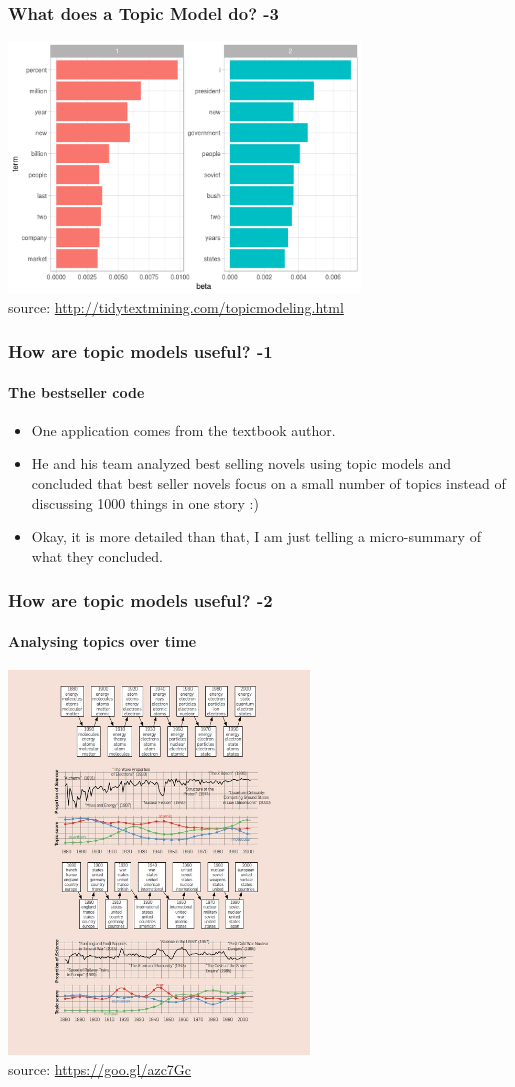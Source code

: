 \documentclass{beamer}
\begin{document}
\begin{frame}
\frametitle{What does a Topic Model do? -3}
\includegraphics[width=0.7\textwidth]{tm-plot.png}
\footnotesize \\ source: \url{http://tidytextmining.com/topicmodeling.html}
\end{frame}

\begin{frame}
\frametitle{How are topic models useful? -1}
\framesubtitle{The bestseller code}
\begin{itemize}
\item One application comes from the textbook author.
\item He and his team analyzed best selling novels using topic models and concluded that best seller novels focus on a small number of topics instead of discussing 1000 things in one story :) 
\item Okay, it is more detailed than that, I am just telling a micro-summary of what they concluded.
\end{itemize}
\end{frame}

\begin{frame}
\frametitle{How are topic models useful?  -2}
\framesubtitle{Analysing topics over time}
\includegraphics[width=0.6\textwidth]{topicmodels4.jpeg}
\footnotesize \\ source: \url{https://goo.gl/azc7Gc}
\end{frame}
\end{document}
